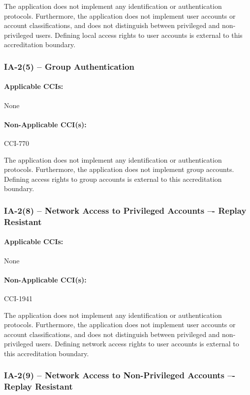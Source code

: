\documentclass[letterpaper, 10pt, twoside]{article}
\begin{document}
The application does not implement any identification or authentication protocols. Furthermore, the application does not implement user accounts or account classifications, and does not distinguish between privileged and non-privileged users. Defining local access rights to user accounts is external to this accreditation boundary.

\subsubsection{IA-2(5) -- Group Authentication}

\paragraph{Applicable CCIs:} None

\paragraph{Non-Applicable CCI(s):} CCI-770

The application does not implement any identification or authentication protocols. Furthermore, the application does not implement group accounts. Defining access rights to group accounts is external to this accreditation boundary.

\subsubsection{IA-2(8) -- Network Access to Privileged Accounts –- Replay Resistant}

\paragraph{Applicable CCIs:} None

\paragraph{Non-Applicable CCI(s):} CCI-1941

The application does not implement any identification or authentication protocols. Furthermore, the application does not implement user accounts or account classifications, and does not distinguish between privileged and non-privileged users. Defining network access rights to user accounts is external to this accreditation boundary.

\subsubsection{IA-2(9) -- Network Access to Non-Privileged Accounts –- Replay Resistant}
\end{document}
